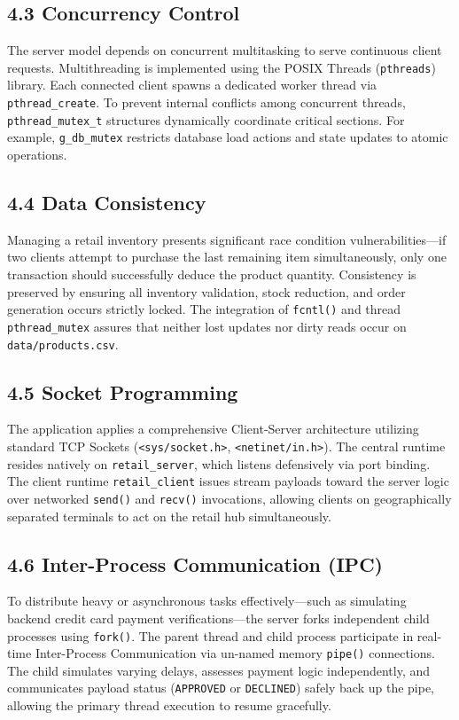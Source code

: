 \documentclass[12pt,a4paper]{article}
\begin{document}
\subsection{4.3 Concurrency Control}
The server model depends on concurrent multitasking to serve continuous client requests. Multithreading is implemented using the POSIX Threads (\texttt{pthreads}) library. Each connected client spawns a dedicated worker thread via \texttt{pthread\_create}. 
To prevent internal conflicts among concurrent threads, \texttt{pthread\_mutex\_t} structures dynamically coordinate critical sections. For example, \texttt{g\_db\_mutex} restricts database load actions and state updates to atomic operations.

\subsection{4.4 Data Consistency}
Managing a retail inventory presents significant race condition vulnerabilities—if two clients attempt to purchase the last remaining item simultaneously, only one transaction should successfully deduce the product quantity. 
Consistency is preserved by ensuring all inventory validation, stock reduction, and order generation occurs strictly locked. The integration of \texttt{fcntl()} and thread \texttt{pthread\_mutex} assures that neither lost updates nor dirty reads occur on \texttt{data/products.csv}.

\subsection{4.5 Socket Programming}
The application applies a comprehensive Client-Server architecture utilizing standard TCP Sockets (\texttt{<sys/socket.h>}, \texttt{<netinet/in.h>}).
The central runtime resides natively on \texttt{retail\_server}, which listens defensively via port binding. The client runtime \texttt{retail\_client} issues stream payloads toward the server logic over networked \texttt{send()} and \texttt{recv()} invocations, allowing clients on geographically separated terminals to act on the retail hub simultaneously. 

\subsection{4.6 Inter-Process Communication (IPC)}
To distribute heavy or asynchronous tasks effectively—such as simulating backend credit card payment verifications—the server forks independent child processes using \texttt{fork()}. 
The parent thread and child process participate in real-time Inter-Process Communication via un-named memory \texttt{pipe()} connections. The child simulates varying delays, assesses payment logic independently, and communicates payload status (\texttt{APPROVED} or \texttt{DECLINED}) safely back up the pipe, allowing the primary thread execution to resume gracefully.
\end{document}
